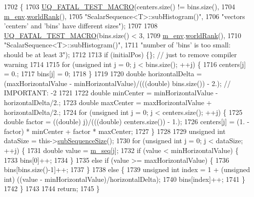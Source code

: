 \begin{DoxyCode}
1702 \{
1703   \hyperlink{_defines_8h_a56d63d18d0a6d45757de47fcc06f574d}{UQ\_FATAL\_TEST\_MACRO}(centers.size() != bins.size(),
1704                       \hyperlink{class_q_u_e_s_o_1_1_scalar_sequence_a71618cd6351b29361b437af68447a4c8}{m\_env}.\hyperlink{class_q_u_e_s_o_1_1_base_environment_a78b57112bbd0e6dd0e8afec00b40ffa7}{worldRank}(),
1705                       \textcolor{stringliteral}{"ScalarSequence<T>::subHistogram()"},
1706                       \textcolor{stringliteral}{"vectors 'centers' and 'bins' have different sizes"});
1707 
1708   \hyperlink{_defines_8h_a56d63d18d0a6d45757de47fcc06f574d}{UQ\_FATAL\_TEST\_MACRO}(bins.size() < 3,
1709                       \hyperlink{class_q_u_e_s_o_1_1_scalar_sequence_a71618cd6351b29361b437af68447a4c8}{m\_env}.\hyperlink{class_q_u_e_s_o_1_1_base_environment_a78b57112bbd0e6dd0e8afec00b40ffa7}{worldRank}(),
1710                       \textcolor{stringliteral}{"ScalarSequence<T>::subHistogram()"},
1711                       \textcolor{stringliteral}{"number of 'bins' is too small: should be at least 3"});
1712 
1713   \textcolor{keywordflow}{if} (initialPos) \{\}; \textcolor{comment}{// just to remove compiler warning}
1714 
1715   \textcolor{keywordflow}{for} (\textcolor{keywordtype}{unsigned} \textcolor{keywordtype}{int} j = 0; j < bins.size(); ++j) \{
1716     centers[j] = 0.;
1717     bins[j] = 0;
1718   \}
1719 
1720   \textcolor{keywordtype}{double} horizontalDelta = (maxHorizontalValue - minHorizontalValue)/(((\textcolor{keywordtype}{double}) bins.size()) - 2.); \textcolor{comment}{//
       IMPORTANT: -2}
1721 
1722   \textcolor{keywordtype}{double} minCenter = minHorizontalValue - horizontalDelta/2.;
1723   \textcolor{keywordtype}{double} maxCenter = maxHorizontalValue + horizontalDelta/2.;
1724   \textcolor{keywordflow}{for} (\textcolor{keywordtype}{unsigned} \textcolor{keywordtype}{int} j = 0; j < centers.size(); ++j) \{
1725     \textcolor{keywordtype}{double} factor = ((double) j)/(((double) centers.size()) - 1.);
1726     centers[j] = (1. - factor) * minCenter + factor * maxCenter;
1727   \}
1728 
1729   \textcolor{keywordtype}{unsigned} \textcolor{keywordtype}{int} dataSize = this->\hyperlink{class_q_u_e_s_o_1_1_scalar_sequence_a0288ea295eedc216a1617b3286f6f3a0}{subSequenceSize}();
1730   \textcolor{keywordflow}{for} (\textcolor{keywordtype}{unsigned} \textcolor{keywordtype}{int} j = 0; j < dataSize; ++j) \{
1731     \textcolor{keywordtype}{double} value = \hyperlink{class_q_u_e_s_o_1_1_scalar_sequence_ae616036fd2e62fb69df167814545e893}{m\_seq}[j];
1732     \textcolor{keywordflow}{if} (value < minHorizontalValue) \{
1733       bins[0]++;
1734     \}
1735     \textcolor{keywordflow}{else} \textcolor{keywordflow}{if} (value >= maxHorizontalValue) \{
1736       bins[bins.size()-1]++;
1737     \}
1738     \textcolor{keywordflow}{else} \{
1739       \textcolor{keywordtype}{unsigned} \textcolor{keywordtype}{int} index = 1 + (\textcolor{keywordtype}{unsigned} int) ((value - minHorizontalValue)/horizontalDelta);
1740       bins[index]++;
1741     \}
1742   \}
1743 
1744   \textcolor{keywordflow}{return};
1745 \}
\end{DoxyCode}

